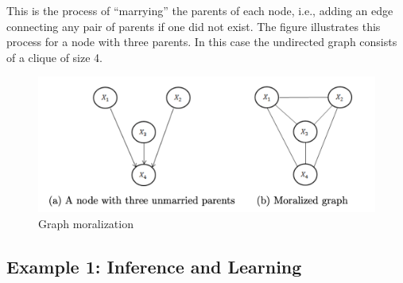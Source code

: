 \documentclass[11pt,a4paper]{article}
\begin{document}
This is the process of “marrying” the parents of each node, i.e., adding an edge connecting any pair of parents if one did not exist. The figure illustrates this process for a node with three parents. In this case the undirected graph consists of a clique of size 4.
\begin{center}\begin{figure}[htbp]
    \centering
    \includegraphics[scale=0.25]{moralization.png}
    \caption{Graph moralization}
    \label{}
\end{figure}\end{center}

\subsection{Example 1: Inference and Learning}
\end{document}
